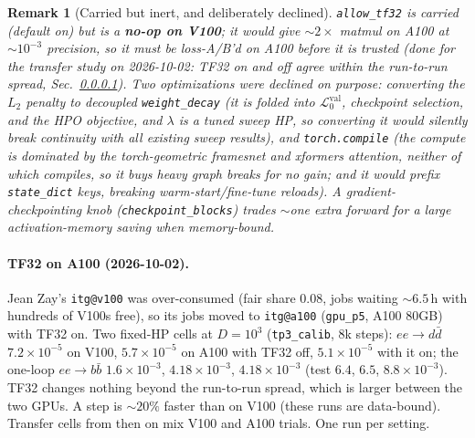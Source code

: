 \documentclass[11pt]{article}
\newcommand{\vlnr}{\mathcal{L}^{\mathrm{val}}_{0}}   %
\newcommand{\code}[1]{\texttt{#1}}
\newtheorem{remark}{Remark}
\begin{document}
\begin{remark}[Carried but inert, and deliberately declined]
\code{allow\_tf32} is carried (default on) but is a \textbf{no-op on V100}; it would give
$\sim2\times$ matmul on A100 at $\sim10^{-3}$ precision, so it must be loss-A/B'd on A100 before
it is trusted (done for the transfer study on 2026-10-02: TF32 on and off agree within the run-to-run spread,
Sec.~\ref{sec:tf32-a100}). Two optimizations were declined on purpose:
converting the $L_2$ penalty to decoupled \code{weight\_decay} (it is folded into $\vlnr$,
checkpoint selection, and the HPO objective, and $\lambda$ is a tuned sweep HP, so converting it
would silently break continuity with all existing sweep results), and \code{torch.compile} (the
compute is dominated by the torch-geometric framesnet and xformers attention, neither of which
compiles, so it buys heavy graph breaks for no gain; and it would prefix \code{state\_dict} keys,
breaking warm-start/fine-tune reloads). A gradient-checkpointing knob
(\code{checkpoint\_blocks}) trades $\sim$one extra forward for a large activation-memory saving
when memory-bound.
\end{remark}

\paragraph{TF32 on A100 (2026-10-02).}\label{sec:tf32-a100} Jean Zay's \code{itg@v100} was over-consumed (fair share
$0.08$, jobs waiting $\sim6.5$\,h with hundreds of V100s free), so its jobs moved to \code{itg@a100} (\code{gpu\_p5}, A100
80GB) with TF32 on. Two fixed-HP cells at $D=10^3$ (\code{tp3\_calib}, $8$k steps): $ee\to d\bar d$ $7.2\times10^{-5}$ on
V100, $5.7\times10^{-5}$ on A100 with TF32 off, $5.1\times10^{-5}$ with it on; the one-loop $ee\to b\bar b$
$1.6\times10^{-3}$, $4.18\times10^{-3}$, $4.18\times10^{-3}$ (test $6.4$, $6.5$, $8.8\times10^{-3}$). TF32 changes nothing
beyond the run-to-run spread, which is larger between the two GPUs. A step is $\sim20\%$ faster than on V100 (these runs
are data-bound). Transfer cells from then on mix V100 and A100 trials. One run per setting.
\end{document}
